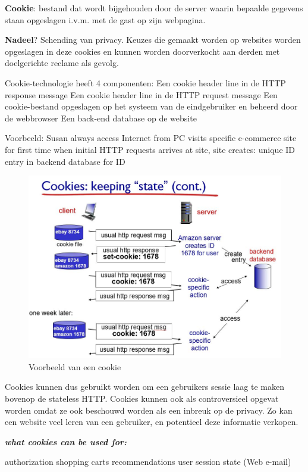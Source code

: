 \textbf{Cookie}: bestand dat wordt bijgehouden door de server waarin bepaalde gegevens staan opgeslagen i.v.m. met de gast op zijn webpagina.

\textbf{Nadeel}? Schending van privacy. Keuzes die gemaakt worden op websites worden opgeslagen in deze cookies en kunnen worden doorverkocht aan derden met doelgerichte reclame als gevolg.

Cookie-technologie heeft 4 componenten:
\be
\itf Een cookie header line in de HTTP response message
\itf Een cookie header line in de HTTP request message
\itf Een cookie-bestand opgeslagen op het systeem van de eindgebruiker en beheerd door de webbrowser
\itf Een back-end database op de website
\ee

\noindent Voorbeeld:
\be
\itf Susan always access Internet from PC
\itf visits specific e-commerce site for first time
\itf when initial HTTP requests arrives at site, site creates:
\itf unique ID
\itf entry in backend database for ID
\ee

\begin{figure}[h]
    \centering
    \includegraphics[width=4.5in]{./img/imghfdst2/cookie.jpg}
    \caption{Voorbeeld van een cookie }
    \label{fig:cookie}
\end{figure}

Cookies kunnen dus gebruikt worden om een gebruikers sessie laag te maken bovenop de stateless HTTP. Cookies kunnen ook als controversieel opgevat worden omdat ze ook beschouwd worden als een inbreuk op de privacy. Zo kan een website veel leren van een gebruiker, en potentieel deze informatie verkopen.

\textit{\textbf{what cookies can be used for:}}

\bi
\itf authorization
\itf shopping carts
\itf recommendations
\itf user session state (Web e-mail)
\ei

